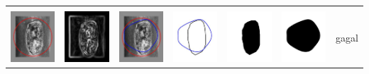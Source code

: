 \begin{table}[H]
\begin{tabular}{|m{0.7in}|m{0.7in}|m{0.7in}|m{0.7in}|m{0.7in}|m{0.7in}|m{0.7in}|}
		&  &  & & & &  \\
		\includegraphics[width=0.7in]{dataset/dataset_3/luka_kuning/ready/10_interp_init.jpg}&
		\includegraphics[width=0.7in]{dataset/dataset_3/luka_kuning/ready/10_interp_ext.jpg}&
		\includegraphics[width=0.7in]{dataset/dataset_3/luka_kuning/ready/10_interp_result.jpg}&
		\includegraphics[width=0.7in]{dataset/dataset_3/luka_kuning/ready/10_gt_r.jpg}&
		\includegraphics[width=0.7in]{dataset/dataset_3/luka_kuning/ready/10_r.jpg}&
		\includegraphics[width=0.7in]{dataset/dataset_3/luka_kuning/ready/10_interp_r.jpg}&
		gagal\\
		\hline		
	\end{tabular}
\end{table}

